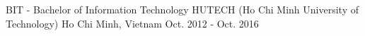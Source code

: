 

\begin{cventries}

  \cventry
    {BIT - Bachelor of Information Technology} %
    {HUTECH (Ho Chi Minh University of Technology)} %
    {Ho Chi Minh, Vietnam} %
    {Oct. 2012 - Oct. 2016} %
    {}

\end{cventries}
